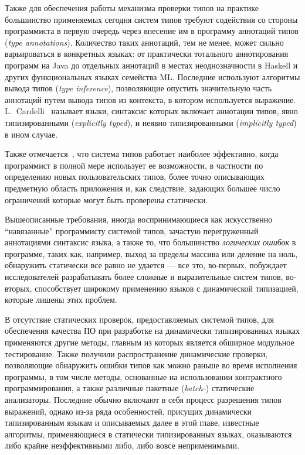 Также для обеспечения работы механизма проверки типов на практике большинство
применяемых сегодня систем типов требуют содействия со стороны программиста в
первую очередь через внесение им в программу аннотаций типов (\emph{type
  annotations}). Количество таких аннотаций, тем не менее, может сильно
варьироваться в конкретных языках: от практически тотального аннотирования
программ на Java до отдельных аннотаций в местах неоднозначности в Haskell и
других функциональных языках семейства ML. Последние используют алгоритмы вывода
типов (\emph{type inference}), позволяющие опустить значительную часть аннотаций
путем вывода типов из контекста, в котором используется выражение.  
L.~Cardelli~\cite{Cardelli2004} называет языки, синтаксис которых включает
аннотации типов, явно типизированными (\emph{explicitly typed}), и неявно
типизированными (\emph{implicitly typed}) в ином случае.

Также отмечается~\cite{Pierce2002}, что система типов работает наиболее
эффективно, когда программист в полной мере использует ее возможности, в
частности по определению новых пользовательских типов, более точно описывающих
предметную область приложения и, как следствие, задающих большее число ограничений
которые могут быть проверены статически.


Вышеописанные требования, иногда воспринимающиеся как искусственно ``навязанные''
программисту системой типов, зачастую перегруженный аннотациями синтаксис языка,
а также то, что большинство \emph{логических ошибок} в программе, таких как, например,
выход за пределы массива или деление на ноль, обнаружить статически все равно не
удается --- все это, во-первых, побуждает исследователей разрабатывать более
сложные и выразительные систем типов, во-вторых, способствует широкому
применению языков с динамической типизацией, которые лишены этих проблем.

В отсутствие статических проверок, предоставляемых системой типов, для
обеспечения качества ПО при разработке на динамически типизированных языках
применяются другие методы, главным из которых является обширное модульное
тестирование. Также получили распространение динамические проверки, позволяющие
обнаружить ошибки типов как можно раньше во время исполнения программы, в том
числе методы, основанные на использовании контрактного программирования, а также
различные пакетные (\emph{batch-}) статические анализаторы. Последние обычно
включают в себя процесс разрешения типов выражений, однако из-за ряда
особенностей, присущих динамически типизированным языкам и описываемых далее в
этой главе, известные алгоритмы, применяющиеся в статически типизированных
языках, оказываются либо крайне неэффективными либо, либо вовсе неприменимыми.

